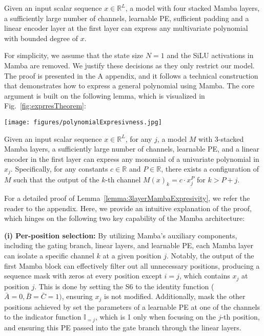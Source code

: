 \begin{theorem}\label{theorem:AnyPolywithMambas}
Given an input scalar sequence $x \in \mathbb{R}^L $, a model with four stacked Mamba layers, a sufficiently large number of channels, learnable PE, sufficient padding and a linear encoder layer at the first layer can express any  multivariate polynomial with bounded degree of $x$.
\end{theorem}

For simplicity, we assume that the state size $N = 1$ and the SiLU activations in Mamba are removed. We justify these decisions as they only restrict our model. The proof is presented in the A
appendix, and it follows a technical construction that demonstrates how to express a general polynomial using Mamba. The core argument is built on the following lemma, which is %
visualized in Fig.~\ref{fig:exprresTheorem}:

\begin{figure*}[]
    \centering
    \vspace{-4pt}
    \texttt{[image: figures/polynomialExpresivness.jpg]}
    \vspace{-7pt}
    \caption{Visualization of 3-stacked Mamba layers expressing monomials of a univariate polynomial, as formulated in Lemma~\ref{lemma:3layerMambaExpresivity}. To simplify the visualization, the Conv1D layer has been omitted.}
    \label{fig:exprresTheorem}
     \vspace{-10pt}
\end{figure*} 
%

\begin{lemma}\label{lemma:3layerMambaExpresivity}
Given an input scalar sequence $x \in \mathbb{R}^L$, for any $j$, a model $M$ with 3-stacked Mamba layers, a sufficiently large number of channels, learnable PE, and a linear encoder in the first layer can express any monomial of a univariate polynomial in $x_j$. Specifically, for any constants $c \in \mathbb{R}$ and $P \in \mathbb{R}$, there exists a configuration of $M$ such that the output of the $k$-th channel $M(x)_k = c \cdot x_j^P$ for $k > P + j$.
\end{lemma}
%
%
For a detailed proof of Lemma~\ref{lemma:3layerMambaExpresivity}, we refer the reader to the appendix. Here, we provide an intuitive explanation of the proof, which hinges on the following two key capability of the Mamba architecture:


{\noindent\textbf{(i) Per-position selection:}} By utilizing Mamba's auxiliary components, including the gating branch, linear layers, and learnable PE, each Mamba layer can isolate a specific channel $k$ at a given position $j$. Notably, the output of the first Mamba block can effectively filter out all unnecessary positions, producing a sequence mask with zeros at every position except $i = j$, which contains $x_j$ at position $j$. This is done by setting the S6 to the identity function ($\bar{A}=0, \bar{B}=\bar{C}=1)$, ensuring $x_j$ is not modified. Additionally, mask the other positions achieved by set the parameters of a learnable PE at one of the channels to the indicator function $\mathbb{I}_{=j}$, which is 1 only when focusing on the $j$-th position, and ensuring this PE passed into the gate branch through the linear layers.


